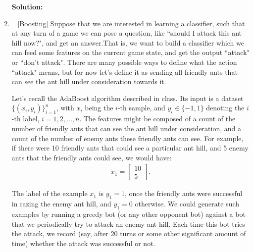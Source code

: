 \documentclass[10pt]{article}
\begin{document}
\begin{enumerate}[1.]
\begin{itemize}
     
	      \end{itemize}


		  \textbf{Solution:}

	      \newpage

    \item ~ [Boosting]
        Suppose that we are interested in learning a classifier, such that at any turn of a game we can pose a question, like ``should I attack this ant hill now?", and get an answer.That is, we want to build a classifier which we can feed some features on the current game state, and get the output ``attack" or ``don't attack". There are many possible ways to define what the action ``attack" means, but for now let's define it as sending all friendly ants that can see the ant hill under consideration towards it.

	    Let's recall the AdaBoost algorithm described in class. Its input is a dataset $\{(x_{i},y_{i})\}_{i=1}^{n}$, with $x_i$ being the $i$-th sample, and $y_{i}\in \{-1,1\}$ denoting the $i$-th label, $i=1,2,...,n$. The features might be composed of a count of the number of friendly ants that can see the ant hill under consideration, and a count of the number of enemy ants these friendly ants can see. For example, if there were 10 friendly ants that could see a particular ant hill, and 5 enemy ants that the friendly ants could see, we would have:
	    \begin{align*}
		    x_1 = \begin{bmatrix}
			10 \\
			5
		    \end{bmatrix}.
	    \end{align*}

	    The label of the example $x_{1}$ is $y_{1} = 1$, once the friendly ants were successful in razing the enemy ant hill, and $y_{1} = 0$ otherwise. We could generate such examples by running a greedy bot (or any other opponent bot) against a bot that we periodically try to attack an enemy ant hill. Each time this bot tries the attack, we record (say, after $20$ turns or some other significant amount of time) whether the attack was successful or not.


\end{enumerate}
\end{document}
